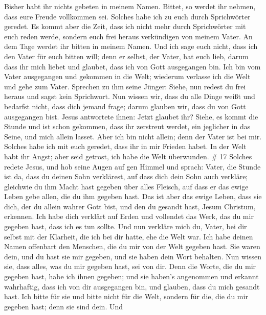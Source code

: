 Bisher habt ihr nichts gebeten in meinem Namen. Bittet, so werdet ihr
nehmen, dass eure Freude vollkommen sei.  Solches habe ich
zu euch durch Sprichwörter geredet. Es kommt aber die Zeit, dass ich
nicht mehr durch Sprichwörter mit euch reden werde, sondern euch frei
heraus verkündigen von meinem Vater.  An dem Tage werdet
ihr bitten in meinem Namen. Und ich sage euch nicht, dass ich den Vater
für euch bitten will;  denn er selbst, der Vater, hat euch
lieb, darum dass ihr mich liebet und glaubet, dass ich von Gott
ausgegangen bin.  Ich bin vom Vater ausgegangen und
gekommen in die Welt; wiederum verlasse ich die Welt und gehe zum Vater.
 Sprechen zu ihm seine Jünger: Siehe, nun redest du frei
heraus und sagst kein Sprichwort.  Nun wissen wir, dass du
alle Dinge weißt und bedarfst nicht, dass dich jemand frage; darum
glauben wir, dass du von Gott ausgegangen bist.  Jesus
antwortete ihnen: Jetzt glaubet ihr?  Siehe, es kommt die
Stunde und ist schon gekommen, dass ihr zerstreut werdet, ein jeglicher
in das Seine, und mich allein lasset. Aber ich bin nicht allein; denn
der Vater ist bei mir.  Solches habe ich mit euch geredet,
dass ihr in mir Frieden habet. In der Welt habt ihr Angst; aber seid
getrost, ich habe die Welt überwunden. \# 17  Solches redete
Jesus, und hob seine Augen auf gen Himmel und sprach: Vater, die Stunde
ist da, dass du deinen Sohn verklärest, auf dass dich dein Sohn auch
verkläre;  gleichwie du ihm Macht hast gegeben über alles
Fleisch, auf dass er das ewige Leben gebe allen, die du ihm gegeben
hast.  Das ist aber das ewige Leben, dass sie dich, der du
allein wahrer Gott bist, und den du gesandt hast, Jesum Christum,
erkennen.  Ich habe dich verklärt auf Erden und vollendet
das Werk, das du mir gegeben hast, dass ich es tun sollte. 
Und nun verkläre mich du, Vater, bei dir selbst mit der Klarheit, die
ich bei dir hatte, ehe die Welt war.  Ich habe deinen Namen
offenbart den Menschen, die du mir von der Welt gegeben hast. Sie waren
dein, und du hast sie mir gegeben, und sie haben dein Wort behalten.
 Nun wissen sie, dass alles, was du mir gegeben hast, sei
von dir.  Denn die Worte, die du mir gegeben hast, habe ich
ihnen gegeben; und sie haben's angenommen und erkannt wahrhaftig, dass
ich von dir ausgegangen bin, und glauben, dass du mich gesandt hast.
 Ich bitte für sie und bitte nicht für die Welt, sondern für
die, die du mir gegeben hast; denn sie sind dein.  Und

